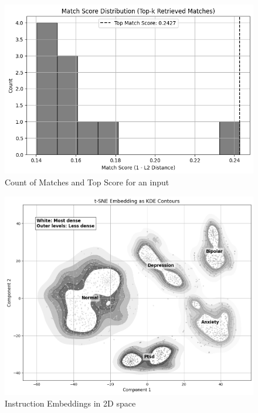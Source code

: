 \pagebreak

\begin{figure}[H]
  \centering
  \includegraphics[width=1.0\textwidth]{Images/RAG_MATCHSCORE.png}
  \vspace{-0.75cm}
  \caption{Count of Matches and Top Score for an input}
  \label{fig:wellbeing_questions}
\end{figure}

\vspace{-0.625cm}

\begin{figure}[H]
    \centering
    \includegraphics[width=1.0\textwidth]{Images/RAG_WBEMBED.png}
    \vspace{-0.75cm}
    \caption{Instruction Embeddings in 2D space}
    \label{fig:wellbeing_questions}
\end{figure}

